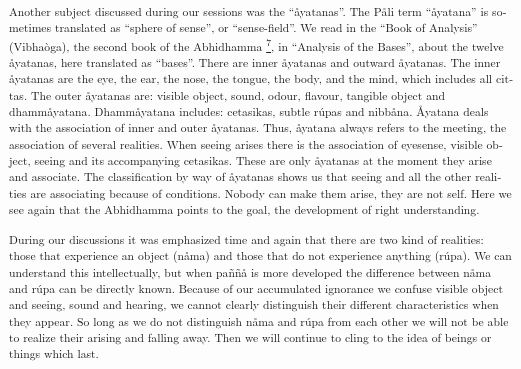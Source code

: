 \textsuperscript{\textdutch{Another subject discussed during our
sessions was the ``åyatanas''. T}\textenglish[variant=american]{he
P}\textdanish{å}\textenglish[variant=american]{li term
}``åyatana''\textdutch{ is sometimes translated as
}``\textdutch{s}\textenglish[variant=american]{phere of
sense}''\textdutch{, or ``sense-field''.}\textenglish[variant=american]{
We read in the }``\textenglish[variant=american]{Book of Analysis}''
(Vibha\textitalian{ò}\textenglish[variant=american]{ga), the second book
of the Abhidhamma
\protect\hyperlink{sdfootnote7sym}{\textsuperscript{7}}}\textitalian{,
in }``\textenglish[variant=american]{Analysis of the
Bases}''\textenglish[variant=american]{, about the twelve
}\textdanish{å}\textenglish[variant=american]{yatanas, here translated
as }``\textenglish[variant=american]{bases}''. \textdutch{There are
inner }\textdanish{å}yatanas\textdutch{ and outward
}\textdanish{å}yatanas\textdutch{. The inner
}\textdanish{å}yatanas\textdutch{ are
}\textenglish[variant=american]{the eye, the ear, the nose, the tongue,
the body, }\textdutch{and }\textenglish[variant=american]{the
mind}\textdutch{, which includes all cittas. The outer
}\textdanish{å}yatanas\textdutch{ are:
}\textenglish[variant=american]{visible object, sound, odour, flavour,
tangible object and }\textdutch{dhamm}\textdanish{å}yatana.
\textdutch{Dhamm}\textdanish{å}yatana \textdutch{includes: cetasikas,
subtle rúpas and nibbåna. Å}yatana\textdutch{ deals with the association
of inner and outer }\textdanish{å}yatanas\textdutch{. Thus, åyatana
always refers to the meeting, the association of several realities. When
seeing arises there is the association of eyesense, visible object,
seeing and its accompanying cetasikas. These are only åyatanas at the
moment they arise and associate. T}\textenglish[variant=american]{he
classification by way of }\textdanish{å}yatanas \textdutch{shows us that
seeing and all the other realities are associating because of
conditions. Nobody can make them arise, they are not self.
}\textenglish[variant=american]{Here we see again that the Abhidhamma
points to the goal, the development of right understanding.}}

\textsuperscript{\textdutch{During our discussions it was emphasized
time and again that there are two kind of realities: those that
experience an object (nåma) and those that do not experience anything
(rúpa). We can understand this intellectually, but when paññå is more
developed the difference between nåma and rúpa can be directly known.
}\textenglish[variant=american]{Because of our accumulated ignorance we
confuse visible object and seeing, sound and hearing, we cannot clearly
distinguish their different characteristics when they appear. So long as
we do not distinguish n}\textdanish{å}\textenglish[variant=american]{ma
and r}ú\textenglish[variant=american]{pa from each other we will not be
able to realize their arising and falling away. Then we will continue to
cling to the idea of beings or things which last. }}

